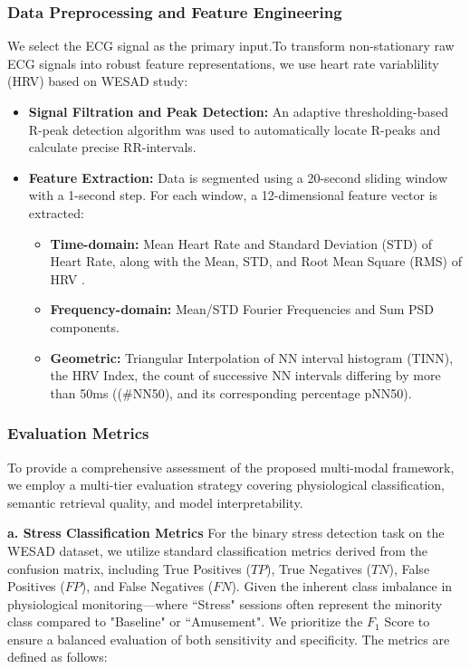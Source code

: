 \documentclass[journal,twoside,web]{ieeecolor}
\begin{document}
\subsubsection {Data Preprocessing and Feature Engineering} 
We select the ECG signal as the primary input.To transform non-stationary raw ECG signals into robust feature representations, we use heart
rate variablility (HRV) based on WESAD study\cite{schmidt2018introducing}:
\begin{itemize}
\item \textbf{Signal Filtration and Peak Detection:} An adaptive thresholding-based R-peak detection algorithm was used to automatically locate R-peaks and calculate precise RR-intervals.
\item \textbf{Feature Extraction:} Data is segmented using a 20-second sliding window with a 1-second step. For each window, a 12-dimensional feature vector is extracted:
\begin{itemize}
\item \textbf{Time-domain:} Mean Heart Rate and Standard Deviation (STD) of Heart Rate, along with the Mean, STD, and Root Mean Square (RMS) of HRV .
\item \textbf{Frequency-domain:} Mean/STD Fourier Frequencies and Sum PSD components.
\item \textbf{Geometric:} Triangular Interpolation of NN interval histogram (TINN), the HRV Index, the count of successive NN intervals differing by more than 50ms ((\#NN50), and its corresponding percentage pNN50).
\end{itemize}
\end{itemize}
\subsubsection{Evaluation Metrics}

To provide a comprehensive assessment of the proposed multi-modal framework, we employ a multi-tier evaluation strategy covering physiological classification, semantic retrieval quality, and model interpretability.

\textbf{a. Stress Classification Metrics}
For the binary stress detection task on the WESAD dataset, we utilize standard classification metrics derived from the confusion matrix, including True Positives ($TP$), True Negatives ($TN$), False Positives ($FP$), and False Negatives ($FN$). Given the inherent class imbalance in physiological monitoring—where ``Stress" sessions often represent the minority class compared to "Baseline" or ``Amusement". We prioritize the $F_1$ Score to ensure a balanced evaluation of both sensitivity and specificity. The metrics are defined as follows:
\end{document}

